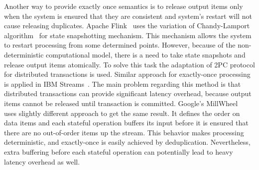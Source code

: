 Another way to provide exactly once semantics is to release output items only when the system is ensured that they are consistent and system's restart will not cause releasing duplicates. Apache Flink~\cite{Carbone:2017:SMA:3137765.3137777} uses the variation of Chandy-Lamport algorithm~\cite{Chandy:1985:DSD:214451.214456} for state snapshotting mechanism. This mechanism allows the system to restart processing from some determined points. However, because of the non-deterministic computational model, there is a need to take state snapshots and release output items atomically. To solve this task the adaptation of 2PC protocol for distributed transactions is used. Similar approach for exactly-once processing is applied in IBM Streams~\cite{jacques2016consistent}. The main problem regarding this method is that distributed transactions can provide significant latency overhead, because output items cannot be released until transaction is committed. Google's MillWheel~\cite{Akidau:2013:MFS:2536222.2536229} uses slightly different approach to get the same result. It defines the order on data items and each stateful operation buffers its input before it is ensured that there are no out-of-order items up the stream. This behavior makes processing deterministic, and exactly-once is easily achieved by deduplication. Nevertheless, extra buffering before each stateful operation can potentially lead to heavy latency overhead as well.  

